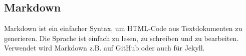 \subsection{Markdown}

Markdown ist ein einfacher Syntax, um HTML-Code aus Textdokumenten zu generieren. Die 
Sprache ist einfach zu lesen, zu schreiben und zu bearbeiten. Verwendet wird Markdown 
z.B. auf GitHub oder auch für Jekyll.\cite{markdown} 